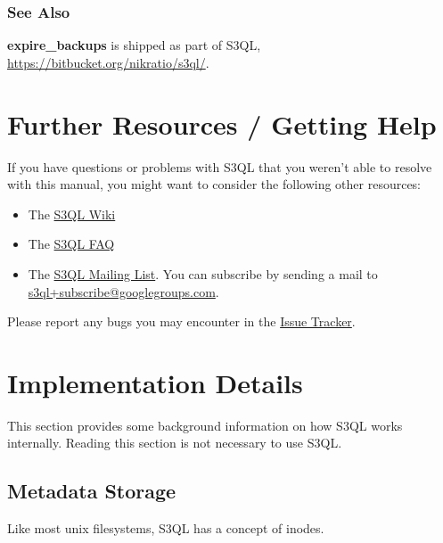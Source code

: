 \documentclass[letterpaper,10pt,english]{sphinxmanual}
\begin{document}
\subsection{See Also}
\label{man/expire_backups:see-also}
\textbf{expire\_backups} is shipped as part of S3QL, \href{https://bitbucket.org/nikratio/s3ql/}{https://bitbucket.org/nikratio/s3ql/}.


\chapter{Further Resources / Getting Help}
\label{resources::doc}\label{resources:resources}\label{resources:further-resources-getting-help}
If you have questions or problems with S3QL that you weren't able to
resolve with this manual, you might want to consider the following other resources:
\begin{itemize}
\item {} 
The \href{https://bitbucket.org/nikratio/s3ql/wiki}{S3QL Wiki}

\item {} 
The \href{https://bitbucket.org/nikratio/s3ql/wiki/FAQ}{S3QL FAQ}

\item {} 
The \href{http://groups.google.com/group/s3ql}{S3QL Mailing List}. You
can subscribe by sending a mail to
\href{mailto:s3ql+subscribe@googlegroups.com}{s3ql+subscribe@googlegroups.com}.

\end{itemize}

Please report any bugs you may encounter in the \href{https://bitbucket.org/nikratio/s3ql/issues}{Issue Tracker}.


\chapter{Implementation Details}
\label{impl_details::doc}\label{impl_details:impl-details}\label{impl_details:implementation-details}
This section provides some background information on how S3QL works
internally. Reading this section is not necessary to use S3QL.


\section{Metadata Storage}
\label{impl_details:metadata-storage}
Like most unix filesystems, S3QL has a concept of inodes.
\end{document}
